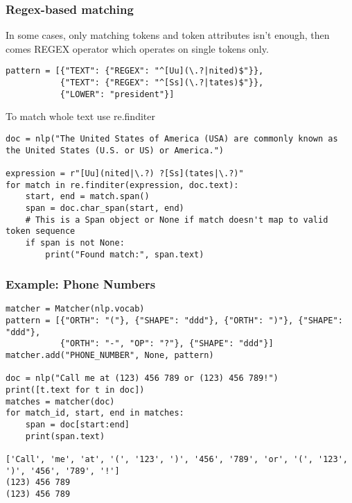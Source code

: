 \begin{frame}[fragile]\frametitle{Regex-based matching }

In some cases, only matching tokens and token attributes isn’t enough, then comes REGEX operator which  operates on single tokens only. 

\begin{lstlisting}
pattern = [{"TEXT": {"REGEX": "^[Uu](\.?|nited)$"}},
           {"TEXT": {"REGEX": "^[Ss](\.?|tates)$"}},
           {"LOWER": "president"}]
\end{lstlisting}
	
	To match whole text use re.finditer
	
	\begin{lstlisting}
doc = nlp("The United States of America (USA) are commonly known as the United States (U.S. or US) or America.")

expression = r"[Uu](nited|\.?) ?[Ss](tates|\.?)"
for match in re.finditer(expression, doc.text):
    start, end = match.span()
    span = doc.char_span(start, end)
    # This is a Span object or None if match doesn't map to valid token sequence
    if span is not None:
        print("Found match:", span.text)
\end{lstlisting}

\end{frame}

\begin{frame}[fragile]\frametitle{Example: Phone Numbers}



\begin{lstlisting}
matcher = Matcher(nlp.vocab)
pattern = [{"ORTH": "("}, {"SHAPE": "ddd"}, {"ORTH": ")"}, {"SHAPE": "ddd"},
           {"ORTH": "-", "OP": "?"}, {"SHAPE": "ddd"}]
matcher.add("PHONE_NUMBER", None, pattern)

doc = nlp("Call me at (123) 456 789 or (123) 456 789!")
print([t.text for t in doc])
matches = matcher(doc)
for match_id, start, end in matches:
    span = doc[start:end]
    print(span.text)
		
['Call', 'me', 'at', '(', '123', ')', '456', '789', 'or', '(', '123', ')', '456', '789', '!']
(123) 456 789
(123) 456 789		
\end{lstlisting}


\end{frame}



